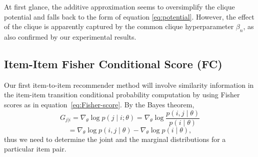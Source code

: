 At first glance, the additive approximation seems to oversimplify the clique potential and falls back to the form of equation \eqref{eq:potential}. However, the effect of the clique is apparently captured by the common clique hyperparameter $\beta_{n}$, as also confirmed by our experimental results.

\subsection{Item-Item Fisher Conditional Score (FC)}
\label{sec:fs_rank}
\label{sect:FC}

Our first item-to-item recommender method will involve similarity information in the item-item transition conditional probability computation by using Fisher scores as in equation~\eqref{eq:Fisher-score}.
By the Bayes theorem,
%
\begin{equation*}
G_{j|i} = \nabla_{\theta} \log p(j \mid i; \theta) = \nabla_{\theta} \log \frac{p(i,j \mid \theta)}{p(i \mid \theta)}
\nonumber
\end{equation*}
%
\begin{equation}
= \nabla_{\theta} \log p(i,j \mid \theta) - \nabla_{\theta} \log p(i \mid \theta),
\label{eq:fisher_score_cond}
\end{equation}
%
thus we need to determine the joint and the marginal distributions for a particular item pair. 

